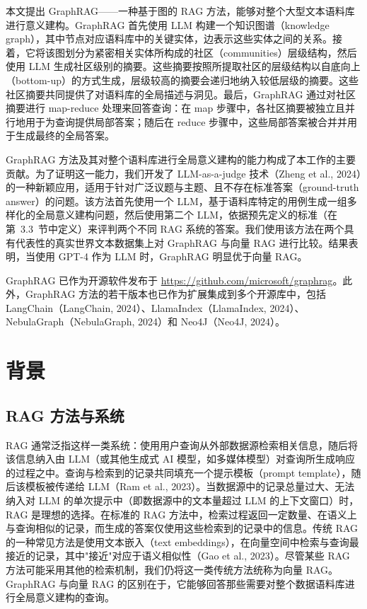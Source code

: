 \documentclass[11pt,UTF8,fontset=fandol]{ctexart}
\begin{document}
本文提出 GraphRAG——一种基于图的 RAG 方法，能够对整个大型文本语料库进行意义建构。GraphRAG 首先使用 LLM 构建一个知识图谱（knowledge graph），其中节点对应语料库中的关键实体，边表示这些实体之间的关系。接着，它将该图划分为紧密相关实体所构成的社区（communities）层级结构，然后使用 LLM 生成社区级别的摘要。这些摘要按照所提取社区的层级结构以自底向上（bottom-up）的方式生成，层级较高的摘要会递归地纳入较低层级的摘要。这些社区摘要共同提供了对语料库的全局描述与洞见。最后，GraphRAG 通过对社区摘要进行 map-reduce 处理来回答查询：在 map 步骤中，各社区摘要被独立且并行地用于为查询提供局部答案；随后在 reduce 步骤中，这些局部答案被合并并用于生成最终的全局答案。

GraphRAG 方法及其对整个语料库进行全局意义建构的能力构成了本工作的主要贡献。为了证明这一能力，我们开发了 LLM-as-a-judge 技术（Zheng et al., 2024）的一种新颖应用，适用于针对广泛议题与主题、且不存在标准答案（ground-truth answer）的问题。该方法首先使用一个 LLM，基于语料库特定的用例生成一组多样化的全局意义建构问题，然后使用第二个 LLM，依据预先定义的标准（在第~3.3~节中定义）来评判两个不同 RAG 系统的答案。我们使用该方法在两个具有代表性的真实世界文本数据集上对 GraphRAG 与向量 RAG 进行比较。结果表明，当使用 GPT-4 作为 LLM 时，GraphRAG 明显优于向量 RAG。

GraphRAG 已作为开源软件发布于 \url{https://github.com/microsoft/graphrag}。此外，GraphRAG 方法的若干版本也已作为扩展集成到多个开源库中，包括 LangChain（LangChain, 2024）、LlamaIndex（LlamaIndex, 2024）、NebulaGraph（NebulaGraph, 2024）和 Neo4J（Neo4J, 2024）。

\section{背景}

\subsection{RAG 方法与系统}

RAG 通常泛指这样一类系统：使用用户查询从外部数据源检索相关信息，随后将该信息纳入由 LLM（或其他生成式 AI 模型，如多媒体模型）对查询所生成响应的过程之中。查询与检索到的记录共同填充一个提示模板（prompt template），随后该模板被传递给 LLM（Ram et al., 2023）。当数据源中的记录总量过大、无法纳入对 LLM 的单次提示中（即数据源中的文本量超过 LLM 的上下文窗口）时，RAG 是理想的选择。在标准的 RAG 方法中，检索过程返回一定数量、在语义上与查询相似的记录，而生成的答案仅使用这些检索到的记录中的信息。传统 RAG 的一种常见方法是使用文本嵌入（text embeddings），在向量空间中检索与查询最接近的记录，其中"接近"对应于语义相似性（Gao et al., 2023）。尽管某些 RAG 方法可能采用其他的检索机制，我们仍将这一类传统方法统称为向量 RAG。GraphRAG 与向量 RAG 的区别在于，它能够回答那些需要对整个数据语料库进行全局意义建构的查询。
\end{document}
